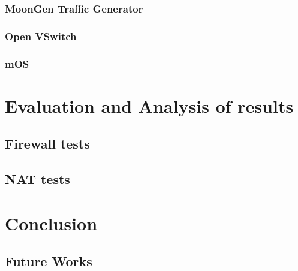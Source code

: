 \documentclass[11pt,a4paper,twoside,openright,bachelor,english]{netthesis}
\begin{document}
\subsection{MoonGen Traffic Generator}

\subsection{Open VSwitch}

\subsection{mOS}

\chapter{Evaluation and Analysis of results}

\section{Firewall tests}

\section{NAT tests}

\chapter{Conclusion}

\section{Future Works}


%
\appendix
%

%





\end{document}
